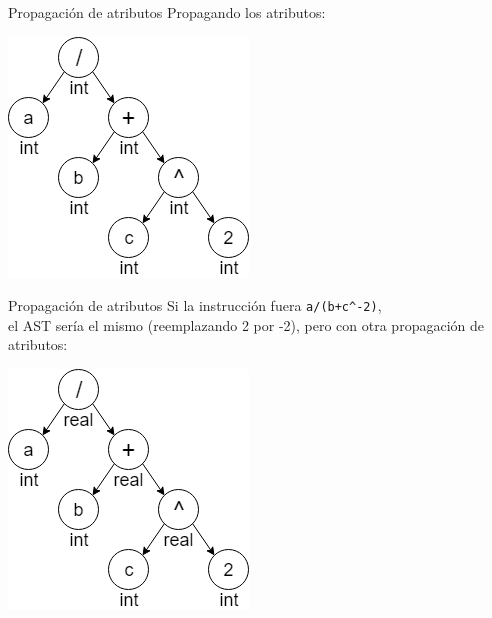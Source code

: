 \documentclass[handout]{beamer} %
\begin{document}
\begin{frame}{Propagación de atributos}
    Propagando los atributos:\\
    
    \begin{center}
    \includegraphics[width=.5\textwidth]{./image/cap3/AST-3}
    \end{center}
\end{frame}

\begin{frame}{Propagación de atributos}
    Si la instrucción fuera \texttt{a/(b+c\string^-2)},\\
    el AST sería el mismo (reemplazando 2 por -2), pero con otra propagación de atributos:
    \begin{center}
    \includegraphics[width=.5\textwidth]{./image/cap3/AST-4}
    \end{center}
\end{frame}
\end{document}

